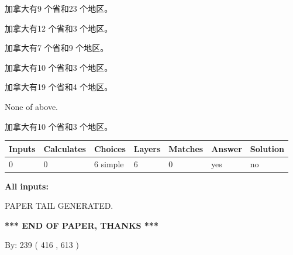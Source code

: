\documentclass{ctexart}
\begin{document}
 
加拿大有9 个省和23 个地区。
 
 
加拿大有12 个省和3 个地区。
 
 
加拿大有7 个省和9 个地区。
 
 
加拿大有10 个省和3 个地区。
 
 
加拿大有19 个省和4 个地区。
 
 
 None of above.
 
 
\noindent{}
 
 
加拿大有10 个省和3 个地区。
 
 
\noindent{}
 
 
   
   
   
   
\noindent\begin{tabular}{|l|l|l|l|l|l|l|}
 \hline
Inputs & Calculates & Choices & Layers & Matches & Answer & Solution \\ \hline
 0  & 
 0  & 
 6
  simple  
  & 
 6  & 
 0  & 
  yes & 
  no 
  \\ \hline
 \end{tabular}
   
   
   
   
\noindent{}
   
   
   
   
\noindent\vspace{0.1in}\hspace{-0.08in} {\textbf{\Large{All inputs: }}}
   
   
   
   
   
   
 \vspace{0.2in}
 
   
   
\vspace{2.0in} PAPER TAIL GENERATED.
   
   
   
   
\vspace{1.0in} 
{\textbf{\large{ *** END OF PAPER, THANKS *** }}} 
   
   
\hspace{1.0in} By: 
 239 ( 416 ,  613 )
   
\end{document}
